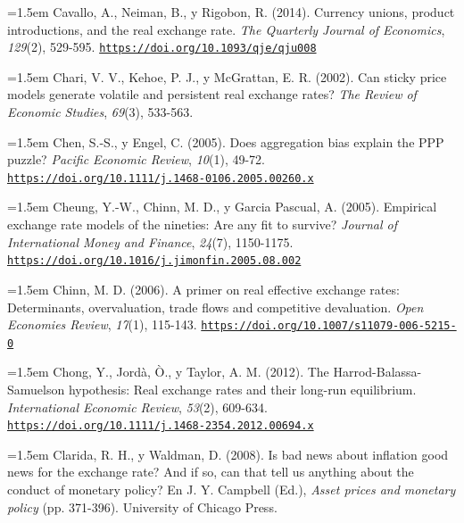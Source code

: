 \documentclass[10pt,a4paper]{article}
\begin{document}
\noindent\hangindent=1.5em Cavallo, A., Neiman, B., y Rigobon, R. (2014). Currency unions, product introductions, and the real exchange rate. \textit{The Quarterly Journal of Economics}, \textit{129}(2), 529-595. \href{https://doi.org/10.1093/qje/qju008}{\nolinkurl{https://doi.org/10.1093/qje/qju008}}

\noindent\hangindent=1.5em Chari, V. V., Kehoe, P. J., y McGrattan, E. R. (2002). Can sticky price models generate volatile and persistent real exchange rates? \textit{The Review of Economic Studies}, \textit{69}(3), 533-563.

\noindent\hangindent=1.5em Chen, S.-S., y Engel, C. (2005). Does aggregation bias explain the PPP puzzle? \textit{Pacific Economic Review}, \textit{10}(1), 49-72. \href{https://doi.org/10.1111/j.1468-0106.2005.00260.x}{\nolinkurl{https://doi.org/10.1111/j.1468-0106.2005.00260.x}}

\begin{sloppypar}\noindent\hangindent=1.5em Cheung, Y.-W., Chinn, M. D., y Garcia Pascual, A. (2005). Empirical exchange rate models of the nineties: Are any fit to survive? \textit{Journal of International Money and Finance}, \textit{24}(7), 1150-1175. \href{https://doi.org/10.1016/j.jimonfin.2005.08.002}{\nolinkurl{https://doi.org/10.1016/j.jimonfin.2005.08.002}}\end{sloppypar}

\noindent\hangindent=1.5em Chinn, M. D. (2006). A primer on real effective exchange rates: Determinants, overvaluation, trade flows and competitive devaluation. \textit{Open Economies Review}, \textit{17}(1), 115-143. \href{https://doi.org/10.1007/s11079-006-5215-0}{\nolinkurl{https://doi.org/10.1007/s11079-006-5215-0}}

\begin{sloppypar}\noindent\hangindent=1.5em Chong, Y., Jordà, Ò., y Taylor, A. M. (2012). The Harrod-Balassa-Samuelson hypothesis: Real exchange rates and their long-run equilibrium. \textit{International Economic Review}, \textit{53}(2), 609-634. \href{https://doi.org/10.1111/j.1468-2354.2012.00694.x}{\nolinkurl{https://doi.org/10.1111/j.1468-2354.2012.00694.x}}\end{sloppypar}

\noindent\hangindent=1.5em Clarida, R. H., y Waldman, D. (2008). Is bad news about inflation good news for the exchange rate? And if so, can that tell us anything about the conduct of monetary policy? En J. Y. Campbell (Ed.), \textit{Asset prices and monetary policy} (pp. 371-396). University of Chicago Press.
\end{document}
